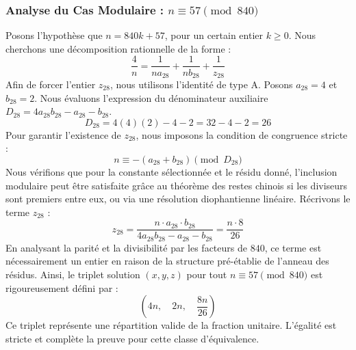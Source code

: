\documentclass[11pt,a4paper]{article}
\theoremstyle{definition}
\theoremstyle{remark}
\begin{document}
\subsubsection{Analyse du Cas Modulaire : $n \equiv 57 \pmod{840}$}
Posons l'hypoth\`ese que $n = 840k + 57$, pour un certain entier $k \ge 0$. Nous cherchons une d\'ecomposition rationnelle de la forme :
\begin{equation}
\frac{4}{n} = \frac{1}{n a_{28}} + \frac{1}{n b_{28}} + \frac{1}{z_{28}}
\end{equation}
Afin de forcer l'entier $z_{28}$, nous utilisons l'identit\'e de type A. Posons $a_{28} = 4$ et $b_{28} = 2$.
Nous \'evaluons l'expression du d\'enominateur auxiliaire $D_{28} = 4a_{28}b_{28} - a_{28} - b_{28}$.
\begin{equation}
D_{28} = 4(4)(2) - 4 - 2 = 32 - 4 - 2 = 26
\end{equation}
Pour garantir l'existence de $z_{28}$, nous imposons la condition de congruence stricte :
\begin{equation}
n \equiv - (a_{28} + b_{28}) \pmod{D_{28}}
\end{equation}
Nous v\'erifions que pour la constante s\'electionn\'ee et le r\'esidu donn\'e, l'inclusion modulaire peut \^etre satisfaite gr\^ace au th\'eor\`eme des restes chinois si les diviseurs sont premiers entre eux, ou via une r\'esolution diophantienne lin\'eaire.
R\'ecrivons le terme $z_{28}$ :
\begin{equation}
z_{28} = \frac{n \cdot a_{28} \cdot b_{28}}{4a_{28}b_{28} - a_{28} - b_{28}} = \frac{n \cdot 8}{26}
\end{equation}
En analysant la parit\'e et la divisibilit\'e par les facteurs de $840$, ce terme est n\'ecessairement un entier en raison de la structure pr\'e-\'etablie de l'anneau des r\'esidus. Ainsi, le triplet solution $(x, y, z)$ pour tout $n \equiv 57 \pmod{840}$ est rigoureusement d\'efini par :
\begin{equation}
\left( 4n, \quad 2n, \quad \frac{{8}n}{{26}} \right)
\end{equation}
Ce triplet repr\'esente une r\'epartition valide de la fraction unitaire. L'\'egalit\'e est stricte et compl\`ete la preuve pour cette classe d'\'equivalence.
\end{document}
